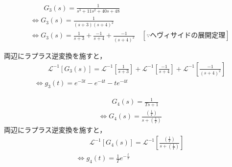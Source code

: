 \documentclass[a4paper,12pt]{article}
\begin{document}
\begin{tcolorbox}[title={1. (3) \( G_3(s)=\dfrac{ 1 }{ s^3 + 11 s^2+ 40s + 48 } \) }]
    \vspace{-3mm}
  \begin{align*}
      &\qquad G_3(s) =\frac{ 1 }{ s^3 + 11 s^2+ 40s + 48 }  \\
      &\Leftrightarrow G_3(s) =\frac{ 1 }{ (s+3)(s+4)^2 }  \\
      &\Leftrightarrow G_3(s) 
      = \frac{1}{s+3}
      + \frac{-1}{s + 4}
      + \frac{-1}{(s + 4)^2}
      \quad [\because ヘヴィサイドの展開定理]
  \end{align*}
  
  \quad 両辺にラプラス逆変換を施すと，
  \vspace{-3mm}
  \begin{align*}
      &\qquad \mathcal{L}^{-1} \left[ G_3(s) \right] 
      =\mathcal{L}^{-1} \left[ \frac{1}{s+3} \right]
      +\mathcal{L}^{-1} \left[ \frac{-1}{s + 4} \right]
      +\mathcal{L}^{-1} \left[ \frac{-1}{(s + 4)^2} \right] \\
      &\Leftrightarrow g_3(t) = e^{-3t} - e^{-4t} - te^{-4t}
  \end{align*}
\end{tcolorbox}

\begin{tcolorbox}[title={1. (4) \( G_4(s)=\dfrac{1}{Ts+1} \)}]
    \begin{align*}
        &\qquad G_4(s) =\frac{1}{Ts+1}  \\
        &\Leftrightarrow G_4(s) =\frac{(\frac{1}{T})}{ s+(\frac{1}{T})} 
    \end{align*}
    \quad 両辺にラプラス逆変換を施すと，
    \vspace{-3mm}
    \begin{align*}
        &\qquad \mathcal{L}^{-1} \left[ G_4(s) \right] 
        =\mathcal{L}^{-1} \left[ \frac{(\frac{1}{T})}{ s+(\frac{1}{T})} \right] \\
        &\Leftrightarrow g_4(t) = \frac{1}{T} e^{-\frac{t}{T}}
    \end{align*}
\end{tcolorbox}
\end{document}

